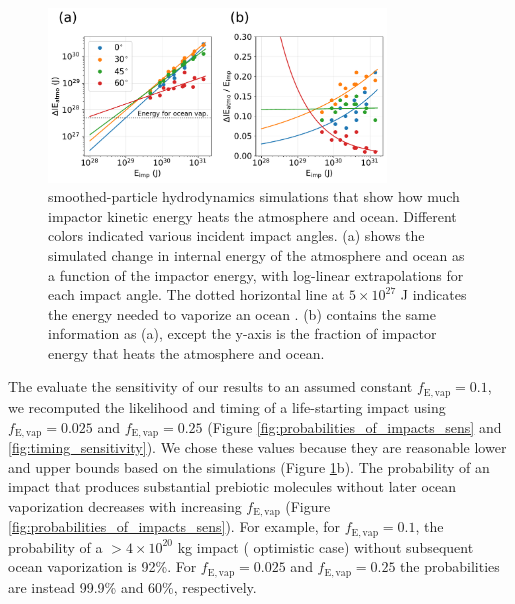 \documentclass[manuscript]{aastex63}
\begin{document}
\begin{figure}
  \centering
  \includegraphics[width=0.8\textwidth]{figures/energy_for_ocean_vap.pdf}
  \caption{\citet{Citron_2022} smoothed-particle hydrodynamics simulations that show how much impactor kinetic energy heats the atmosphere and ocean. Different colors indicated various incident impact angles. (a) shows the simulated change in internal energy of the atmosphere and ocean as a function of the impactor energy, with log-linear extrapolations for each impact angle. The dotted horizontal line at $5 \times 10^{27}$ J indicates the energy needed to vaporize an ocean \citep{Sleep_1989}. (b) contains the same information as (a), except the y-axis is the fraction of impactor energy that heats the atmosphere and ocean.}
  \label{fig:energy_for_ocean_vap}
\end{figure}

The evaluate the sensitivity of our results to an assumed constant $f_\mathrm{E,vap} = 0.1$, we recomputed the likelihood and timing of a life-starting impact using $f_\mathrm{E,vap} = 0.025$ and $f_\mathrm{E,vap} = 0.25$ (Figure \ref{fig:probabilities_of_impacts_sens} and \ref{fig:timing_sensitivity}). We chose these values because they are reasonable lower and upper bounds based on the \citet{Citron_2022} simulations (Figure \ref{fig:energy_for_ocean_vap}b). The probability of an impact that produces substantial prebiotic molecules without later ocean vaporization decreases with increasing $f_\mathrm{E,vap}$ (Figure \ref{fig:probabilities_of_impacts_sens}). For example, for $f_\mathrm{E,vap} = 0.1$, the probability of a $>4 \times 10^{20}$ kg impact (\citet{Wogan_2023} optimistic case) without subsequent ocean vaporization is 92\%. For $f_\mathrm{E,vap} = 0.025$ and $f_\mathrm{E,vap} = 0.25$ the probabilities are instead 99.9\% and 60\%, respectively.
\end{document}

